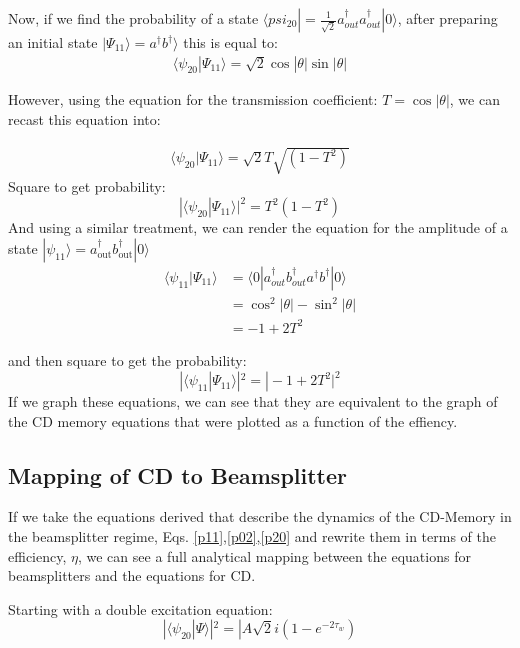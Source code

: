 \documentclass[12pt]{article}
\begin{document}
Now, if we find the probability of a state $\langle psi_{20} | =\frac{1}{\sqrt{2}} a^\dagger_{out} a^\dagger_{out} | 0 \rangle$, after preparing an initial state $| \Psi_11 \rangle = a^\dagger b^\dagger \rangle $ this is equal to:
\begin{align}
\langle \psi_{20}|\Psi_{11} \rangle = \sqrt{2} \cos |\theta| \sin |\theta|
\end{align}

However, using the equation for the transmission coefficient: 
$T = \cos|\theta|$, we can recast this equation into:

\begin{align}
\langle \psi_{20}|\Psi_{11} \rangle = \sqrt{2}  T\sqrt{(1-T^2)}
\end{align}
Square to get probability:
\begin{equation}
\label{bs20}
|\langle \psi_{20} | \Psi_{11} \rangle |^2 = T^2 (1-T^2) 
\end{equation}
And using a similar treatment, we can render the equation for the amplitude of a state $|\psi_{11} \rangle = a^\dagger_\textrm{out} b^\dagger_\textrm{out} | 0 \rangle$
\begin{align}
\langle \psi_{11} | \Psi_{11} \rangle &= \langle 0 | a^\dagger_{out}b^\dagger_{out} a^\dagger b^\dagger |0\rangle\\
&= \cos^2|\theta| - \sin^2|\theta|\\
&= -1+2T^2
\end{align}

and then square to get the probability:
\begin{equation}
|\langle \psi_{11} | \Psi_{11} \rangle |^2 = |-1+2T^2|^2 
\end{equation}
If we graph these equations, we can see that they are equivalent to the graph of the CD memory equations that were plotted as a function of the effiency.

\subsection{Mapping of CD to Beamsplitter}

If we take the equations derived that describe the dynamics of the CD-Memory in
the beamsplitter regime, Eqs. \eqref{p11},\eqref{p02},\eqref{p20}
and rewrite them in terms of the efficiency, $\eta$, we can see a full analytical
mapping between the equations for beamsplitters and the equations for CD.

Starting with a double excitation equation:
\begin{equation}
|\langle \psi_{20}| \Psi \rangle|^2=|A \sqrt{2} i(1- e^{-2\tau_w})
\end{equation}
\end{document}
